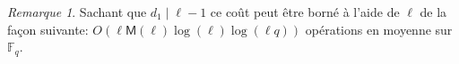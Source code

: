 \documentclass[10pt,a4paper]{book}
\theoremstyle{plain}
\theoremstyle{definition}
\theoremstyle{definition}
\theoremstyle{definition}
\theoremstyle{definition}
\theoremstyle{remark}
\newtheorem{rem}[thm]{Remarque}
\theoremstyle{remark}
\theoremstyle{definition}
\begin{document}
 
\begin{rem}
Sachant que $d_1 \mid \ell-1$ ce coût peut être borné à l'aide de $\ell$ de la façon suivante: $O(\ell\mathsf{M}(\ell)\log(\ell)\log(\ell q))$ opérations en moyenne sur $\mathbb{F}_q$.
\end{rem}
 
\end{document}
